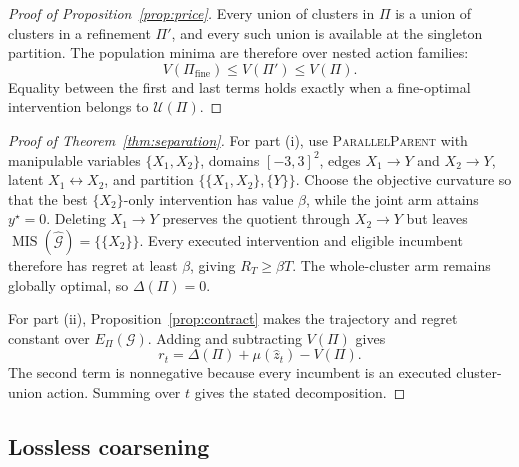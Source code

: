 \documentclass[twoside]{article}
\newcommand{\Gg}{\mathcal{G}}
\begin{document}
\begin{proof}[Proof of Proposition~\ref{prop:price}]
Every union of clusters in \(\Pi\) is a union of clusters in a refinement \(\Pi'\), and every such union is available at the singleton partition. The population minima are therefore over nested action families:
\[
 V(\Pi_{\mathrm{fine}})\le V(\Pi')\le V(\Pi).
\]
Equality between the first and last terms holds exactly when a fine-optimal intervention belongs to \(\mathcal U(\Pi)\).
\end{proof}

\begin{proof}[Proof of Theorem~\ref{thm:separation}]
For part (i), use \textsc{ParallelParent} with manipulable variables \(\{X_1,X_2\}\), domains \([-3,3]^2\), edges \(X_1\to Y\) and \(X_2\to Y\), latent \(X_1\leftrightarrow X_2\), and partition \(\{\{X_1,X_2\},\{Y\}\}\). Choose the objective curvature so that the best \(\{X_2\}\)-only intervention has value \(\beta\), while the joint arm attains \(y^\star=0\). Deleting \(X_1\to Y\) preserves the quotient through \(X_2\to Y\) but leaves \(\operatorname{MIS}(\widehat{\Gg})=\{\{X_2\}\}\). Every executed intervention and eligible incumbent therefore has regret at least \(\beta\), giving \(R_T\ge\beta T\). The whole-cluster arm remains globally optimal, so \(\Delta(\Pi)=0\).

For part (ii), Proposition~\ref{prop:contract} makes the trajectory and regret constant over \(E_\Pi(\Gg)\). Adding and subtracting \(V(\Pi)\) gives
\[
r_t=\Delta(\Pi)+\mu(\hat z_t)-V(\Pi).
\]
The second term is nonnegative because every incumbent is an executed cluster-union action. Summing over \(t\) gives the stated decomposition.
 \end{proof}

\subsection{Lossless coarsening}
\end{document}
